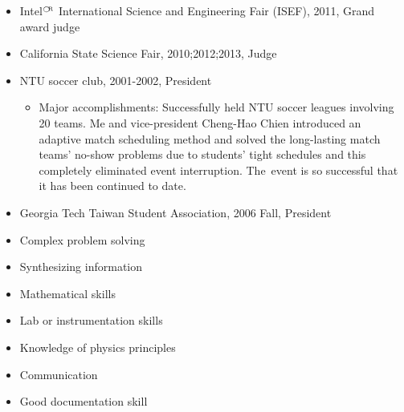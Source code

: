 \documentclass{sebase}
\begin{document}
\bigskip


\begin{itemize}
\item Intel${\tiny \registered }$ International Science and Engineering Fair
(ISEF), 2011, Grand award judge

\item California State Science Fair, 2010;2012;2013, Judge

\item NTU soccer club, 2001-2002, President

\begin{itemize}
\item Major accomplishments: Successfully held NTU soccer leagues involving
20 teams. Me and vice-president Cheng-Hao Chien introduced an adaptive match
scheduling method and solved the long-lasting match teams' no-show problems
due to students' tight schedules and this completely eliminated event
interruption. The\ event is so successful that it has been continued to date.
\end{itemize}

\item Georgia Tech Taiwan Student Association, 2006 Fall, President
\end{itemize}

\bigskip


\begin{multicols}{2}%

\begin{itemize}
\item Complex problem solving

\item Synthesizing information

\item Mathematical skills

\item Lab or instrumentation skills

\item Knowledge of physics principles

\item Communication

\item Good documentation skill
\end{itemize}

\end{multicols}%
\end{document}
